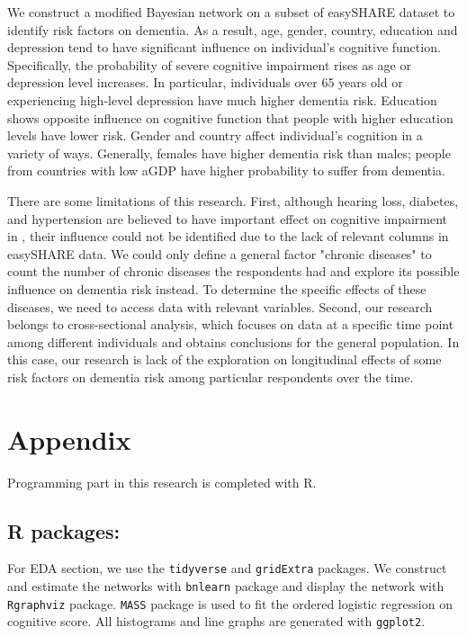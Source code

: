 \documentclass[11pt,twoside]{article}
\numberwithin{Theorem}{section}
\numberwithin{Definition}{section}
\numberwithin{Lemma}{section}
\numberwithin{Algorithm}{section}
\numberwithin{equation}{section}
\begin{document}
We construct a modified Bayesian network on a subset of easySHARE dataset to identify risk factors on dementia. As a result, age, gender, country, education and depression tend to have significant influence on individual's cognitive function. Specifically, the probability of severe cognitive impairment rises as age or depression level increases. In particular, individuals over 65 years old or experiencing high-level depression have much higher dementia risk. Education shows opposite influence on cognitive function that people with higher education levels have lower risk. Gender and country affect individual's cognition in a variety of ways. Generally, females have higher dementia risk than males; people from countries with low aGDP have higher probability to suffer from dementia.

There are some limitations of this research. First, although hearing loss, diabetes, and hypertension are believed to have important effect on cognitive impairment in \cite{livingston2017dementia}, their influence could not be identified due to the lack of relevant columns in easySHARE data. We could only define a general factor "chronic diseases" to count the number of chronic diseases the respondents had and explore its possible influence on dementia risk instead. To determine the specific effects of these diseases, we need to access data with relevant variables. Second, our research belongs to cross-sectional analysis, which focuses on data at a specific time point among different individuals and obtains conclusions for the general population. In this case, our research is lack of the exploration on longitudinal effects of some risk factors on dementia risk among particular respondents over the time.

\clearpage



\clearpage

\appendix
\section*{Appendix}

Programming part in this research is completed with R. 

\subsection*{R packages:}

For EDA section, we use the \texttt{tidyverse} and \texttt{gridExtra} packages. We construct and estimate the networks with \texttt{bnlearn} package and display the network with \texttt{Rgraphviz} package. \texttt{MASS} package is used to fit the ordered logistic regression on cognitive score. All histograms and line graphs are generated with \texttt{ggplot2}.
\end{document}
